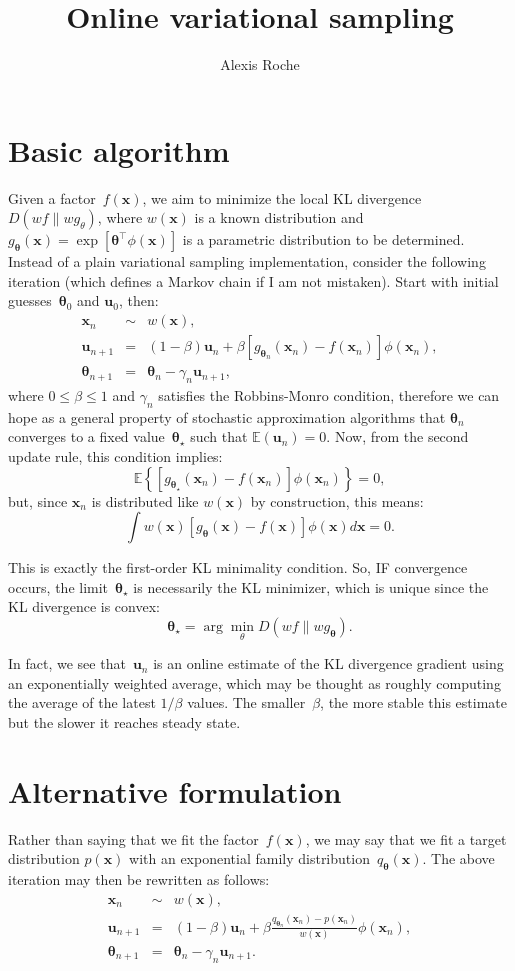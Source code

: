 \documentclass{article}
\title{Online variational sampling}
\author{Alexis Roche}
\def\x{\mathbf{x}}
\def\th{{\boldsymbol{\theta}}}
\def\u{\mathbf{u}}
\def\E{\mathbb{E}}
\begin{document}
\maketitle      

\section{Basic algorithm}

Given a factor~$f(\x)$, we aim to minimize the local KL divergence $D(wf\|wg_\theta)$, where $w(\x)$ is a known distribution and $g_\th(\x)=\exp[\th^\top \phi(\x)]$ is a parametric distribution to be determined. Instead of a plain variational sampling implementation, consider the following iteration (which defines a Markov chain if I am not mistaken). Start with initial guesses~$\th_0$ and $\u_0$, then:
\begin{eqnarray*}
\x_n & \sim & w(\x),\\
\u_{n+1} & = & (1-\beta)\u_n + \beta [g_{\th_n} (\x_n) - f(\x_n)] \phi(\x_n),\\
\th_{n+1} & = & \th_n - \gamma_n \u_{n+1},
\end{eqnarray*}
where $0\leq \beta\leq 1$ and $\gamma_n$ satisfies the Robbins-Monro condition, therefore we can hope as a general property of stochastic approximation algorithms that $\th_n$ converges to a fixed value~$\th_\star$ such that $\E(\u_n) = 0$. Now, from the second update rule, this condition implies:
$$
\E \left\{[g_{\th_\star} (\x_n) - f(\x_n)] \phi(\x_n) \right\}= 0,
$$ 
but, since $\x_n$ is distributed like $w(\x)$ by construction, this means:
$$
\int w(\x) [g_\th (\x) - f(\x)] \phi(\x) d\x = 0.
$$

This is exactly the first-order KL minimality condition. So, IF convergence occurs, the limit~$\th_\star$ is necessarily the KL minimizer, which is unique since the KL divergence is convex:
$$
\th_\star = \arg\min_\theta D(wf\|wg_\th). 
$$

In fact, we see that~$\u_n$ is an online estimate of the KL divergence gradient using an exponentially weighted average, which may be thought as roughly computing the average of the latest $1/\beta$ values. The smaller~$\beta$, the more stable this estimate but the slower it reaches steady state.

\section{Alternative formulation}

Rather than saying that we fit the factor~$f(\x)$, we may say that we fit a target distribution $p(\x)$ with an exponential family distribution~$q_\th(\x)$. The above iteration may then be rewritten as follows:
\begin{eqnarray*}
\x_n & \sim & w(\x),\\
\u_{n+1} & = & (1-\beta)\u_n + \beta \frac{q_{\th_n} (\x_n) - p(\x_n)}{w(\x)} \phi(\x_n),\\
\th_{n+1} & = & \th_n - \gamma_n \u_{n+1}.
\end{eqnarray*}
\end{document}
